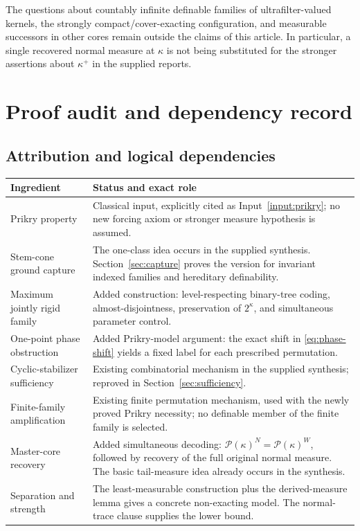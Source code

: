 \documentclass[11pt,letterpaper]{article}
\theoremstyle{definition}
\numberwithin{equation}{section}
\newcommand{\Pow}{\mathcal P}
\begin{document}
The questions about countably infinite definable families of ultrafilter-valued kernels, the strongly compact/cover-exacting configuration, and measurable successors in other cores remain outside the claims of this article. In particular, a single recovered normal measure at $\kappa$ is not being substituted for the stronger assertions about $\kappa^+$ in the supplied reports.

\appendix
\section{Proof audit and dependency record}\label{app:audit}

\subsection{Attribution and logical dependencies}

\begin{center}
\small
\begin{tabularx}{\textwidth}{@{}p{}Y@{}}
\toprule
Ingredient & Status and exact role\\
\midrule
Prikry property & Classical input, explicitly cited as Input~\ref{input:prikry}; no new forcing axiom or stronger measure hypothesis is assumed.\\[3pt]
Stem-cone ground capture & The one-class idea occurs in the supplied synthesis. Section~\ref{sec:capture} proves the version for invariant indexed families and hereditary definability.\\[3pt]
Maximum jointly rigid family & Added construction: level-respecting binary-tree coding, almost-disjointness, preservation of $2^\kappa$, and simultaneous parameter control.\\[3pt]
One-point phase obstruction & Added Prikry-model argument: the exact shift in \eqref{eq:phase-shift} yields a fixed label for each prescribed permutation.\\[3pt]
Cyclic-stabilizer sufficiency & Existing combinatorial mechanism in the supplied synthesis; reproved in Section~\ref{sec:sufficiency}.\\[3pt]
Finite-family amplification & Existing finite permutation mechanism, used with the newly proved Prikry necessity; no definable member of the finite family is selected.\\[3pt]
Master-core recovery & Added simultaneous decoding: $\Pow(\kappa)^N=\Pow(\kappa)^W$, followed by recovery of the full original normal measure. The basic tail-measure idea already occurs in the synthesis.\\[3pt]
Separation and strength & The least-measurable construction plus the derived-measure lemma gives a concrete non-exacting model. The normal-trace clause supplies the lower bound.\\
\bottomrule
\end{tabularx}
\end{center}
\end{document}
